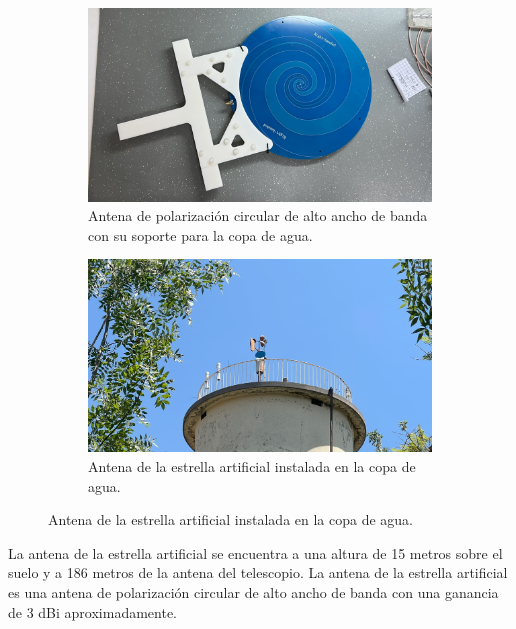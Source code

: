 \begin{figure}[h!]
    \centering
    \begin{subfigure}{0.45\textwidth}
        \includegraphics[width=\textwidth]{img/paleta}
        \caption{Antena de polarización circular de alto ancho de banda con su soporte para la copa de agua.}
        \label{fig:antena_estrella}
    \end{subfigure}
    \begin{subfigure}{0.45\textwidth}
        \includegraphics[width=\textwidth]{img/fake_star}
        \caption{Antena de la estrella artificial instalada en la copa de agua.}
        \label{fig:antena_estrella2}
    \end{subfigure}
\end{figure}

La antena de la estrella artificial se encuentra a una altura de 15 metros sobre el suelo y a 186 metros de la antena del telescopio. La antena de la estrella artificial es una antena de polarización circular de alto ancho de banda con una ganancia de 3 dBi aproximadamente.\\

